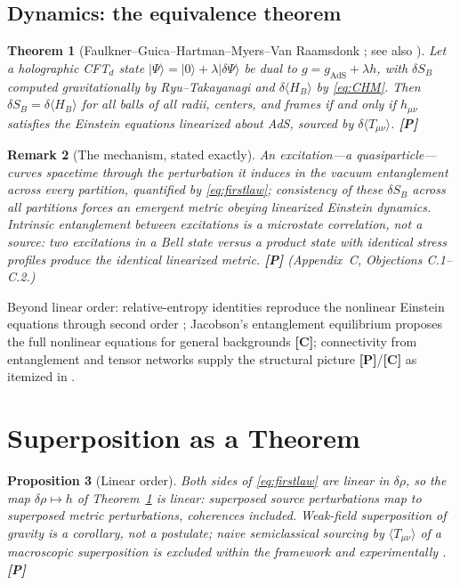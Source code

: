 \documentclass[11pt]{article}
\newtheorem{theorem}{Theorem}[section]
\newtheorem{proposition}[theorem]{Proposition}
\newtheorem{remark}[theorem]{Remark}
\theoremstyle{definition}
\newcommand{\pP}{\textbf{[P]}}
\newcommand{\pC}{\textbf{[C]}}
\begin{document}
\subsection{Dynamics: the equivalence theorem}

\begin{theorem}[Faulkner--Guica--Hartman--Myers--Van Raamsdonk
\cite{Faulkner2014}; see also \cite{Lashkari2014}]
\label{thm:fghmv}
Let a holographic CFT$_d$ state
$|\Psi\rangle=|0\rangle+\lambda|\delta\Psi\rangle$ be dual to
$g=g_{\mathrm{AdS}}+\lambda h$, with $\delta S_B$ computed gravitationally
by Ryu--Takayanagi \cite{RyuTakayanagi2006,HRT2007} and
$\delta\langle H_B\rangle$ by \eqref{eq:CHM}. Then
$\delta S_B=\delta\langle H_B\rangle$ for all balls of all radii, centers,
and frames \emph{if and only if} $h_{\mu\nu}$ satisfies the Einstein
equations linearized about AdS, sourced by
$\delta\langle T_{\mu\nu}\rangle$. \pP{}
\end{theorem}

\begin{remark}[The mechanism, stated exactly]
\label{rem:mechanism}
An excitation---a quasiparticle---curves spacetime through the
perturbation it induces in the \emph{vacuum} entanglement across every
partition, quantified by \eqref{eq:firstlaw}; consistency of these
$\delta S_B$ across all partitions forces an emergent metric obeying
linearized Einstein dynamics. Intrinsic entanglement between excitations
is a microstate correlation, not a source: two excitations in a Bell state
versus a product state with identical stress profiles produce the
identical linearized metric. \pP{} (Appendix~C, Objections C.1--C.2.)
\end{remark}

Beyond linear order: relative-entropy identities reproduce the nonlinear
Einstein equations through second order \cite{Faulkner2017,FLM2013};
Jacobson's entanglement equilibrium \cite{Jacobson2016} proposes the full
nonlinear equations for general backgrounds \pC{}; connectivity from
entanglement \cite{VanRaamsdonk2010,MaldacenaSusskind2013} and tensor
networks \cite{Swingle2012} supply the structural picture \pP{}/\pC{} as
itemized in \cite{McGwier2026a}.

\section{Superposition as a Theorem}
\label{sec:superposition}

\begin{proposition}[Linear order]
Both sides of \eqref{eq:firstlaw} are linear in $\delta\rho$, so the map
$\delta\rho\mapsto h$ of Theorem~\ref{thm:fghmv} is linear:
superposed source perturbations map to superposed metric perturbations,
coherences included. Weak-field superposition of gravity is a corollary,
not a postulate; naive semiclassical sourcing by
$\langle T_{\mu\nu}\rangle$ of a macroscopic superposition is excluded
within the framework and experimentally \cite{PageGeilker1981}. \pP{}
\end{proposition}
\end{document}
